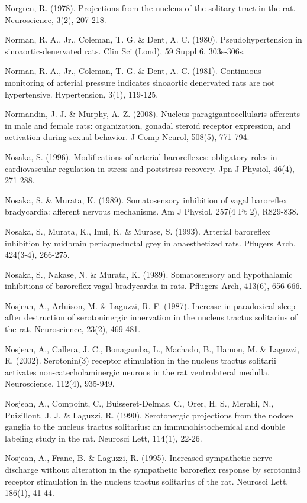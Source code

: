 \documentclass[a4paper,12pt,twoside]{report}
\begin{document}
\begin{singlespacing}
\begin{footnotesize}
Norgren, R. (1978). Projections from the nucleus of the solitary tract in the rat. Neuroscience, 3(2), 207-218.

Norman, R. A., Jr., Coleman, T. G. \& Dent, A. C. (1980). Pseudohypertension in sinoaortic-denervated rats. Clin Sci (Lond), 59 Suppl 6, 303s-306s.

Norman, R. A., Jr., Coleman, T. G. \& Dent, A. C. (1981). Continuous monitoring of arterial pressure indicates sinoaortic denervated rats are not hypertensive. Hypertension, 3(1), 119-125.

Normandin, J. J. \& Murphy, A. Z. (2008). Nucleus paragigantocellularis afferents in male and female rats: organization, gonadal steroid receptor expression, and activation during sexual behavior. J Comp Neurol, 508(5), 771-794.

Nosaka, S. (1996). Modifications of arterial baroreflexes: obligatory roles in cardiovascular regulation in stress and poststress recovery. Jpn J Physiol, 46(4), 271-288.

Nosaka, S. \& Murata, K. (1989). Somatosensory inhibition of vagal baroreflex bradycardia: afferent nervous mechanisms. Am J Physiol, 257(4 Pt 2), R829-838.

Nosaka, S., Murata, K., Inui, K. \& Murase, S. (1993). Arterial baroreflex inhibition by midbrain periaqueductal grey in anaesthetized rats. Pflugers Arch, 424(3-4), 266-275.

Nosaka, S., Nakase, N. \& Murata, K. (1989). Somatosensory and hypothalamic inhibitions of baroreflex vagal bradycardia in rats. Pflugers Arch, 413(6), 656-666.

Nosjean, A., Arluison, M. \& Laguzzi, R. F. (1987). Increase in paradoxical sleep after destruction of serotoninergic innervation in the nucleus tractus solitarius of the rat. Neuroscience, 23(2), 469-481.

Nosjean, A., Callera, J. C., Bonagamba, L., Machado, B., Hamon, M. \& Laguzzi, R. (2002). Serotonin(3) receptor stimulation in the nucleus tractus solitarii activates non-catecholaminergic neurons in the rat ventrolateral medulla. Neuroscience, 112(4), 935-949.

Nosjean, A., Compoint, C., Buisseret-Delmas, C., Orer, H. S., Merahi, N., Puizillout, J. J. \& Laguzzi, R. (1990). Serotonergic projections from the nodose ganglia to the nucleus tractus solitarius: an immunohistochemical and double labeling study in the rat. Neurosci Lett, 114(1), 22-26.

Nosjean, A., Franc, B. \& Laguzzi, R. (1995). Increased sympathetic nerve discharge without alteration in the sympathetic baroreflex response by serotonin3 receptor stimulation in the nucleus tractus solitarius of the rat. Neurosci Lett, 186(1), 41-44.


\end{footnotesize}
\end{singlespacing}
\end{document}
